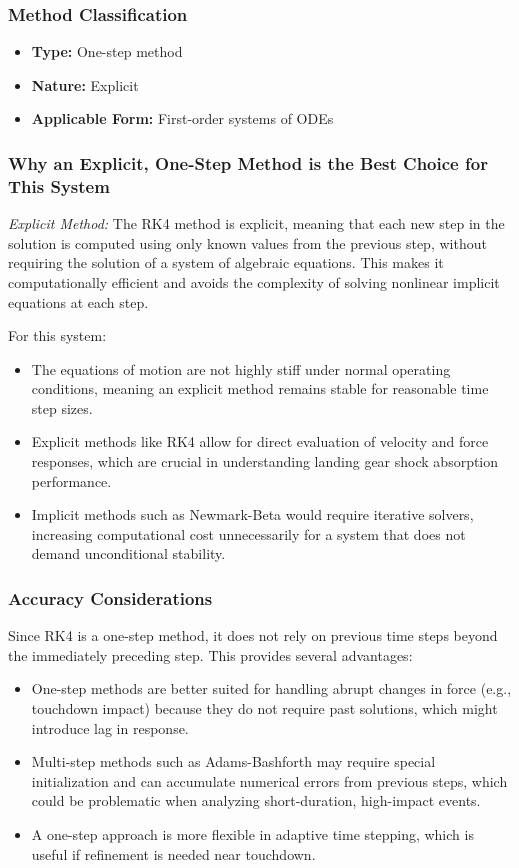 \documentclass[12pt,letterpaper, onecolumn]{exam}
\begin{document}
\begin{questions}
\begin{solution}
\begin{parts}
\subsubsection*{Method Classification}
\begin{itemize}
    \item \textbf{Type:} One-step method
    \item \textbf{Nature:} Explicit
    \item \textbf{Applicable Form:} First-order systems of ODEs
\end{itemize}

\subsubsection*{Why an Explicit, One-Step Method is the Best Choice for This System}

\textit{Explicit Method:} The RK4 method is explicit, meaning that each new step in the solution is computed using only known values from the previous step, without requiring the solution of a system of algebraic equations. This makes it computationally efficient and avoids the complexity of solving nonlinear implicit equations at each step. 

For this system:
\begin{itemize}
    \item The equations of motion are not highly stiff under normal operating conditions, meaning an explicit method remains stable for reasonable time step sizes.
    \item Explicit methods like RK4 allow for direct evaluation of velocity and force responses, which are crucial in understanding landing gear shock absorption performance.
    \item Implicit methods such as Newmark-Beta would require iterative solvers, increasing computational cost unnecessarily for a system that does not demand unconditional stability.
\end{itemize}

\subsubsection*{Accuracy Considerations}

Since RK4 is a one-step method, it does not rely on previous time steps beyond the immediately preceding step. This provides several advantages:
\begin{itemize}
    \item One-step methods are better suited for handling abrupt changes in force (e.g., touchdown impact) because they do not require past solutions, which might introduce lag in response.
    \item Multi-step methods such as Adams-Bashforth may require special initialization and can accumulate numerical errors from previous steps, which could be problematic when analyzing short-duration, high-impact events.
    \item A one-step approach is more flexible in adaptive time stepping, which is useful if refinement is needed near touchdown.
\end{itemize}


\end{parts}
\end{solution}
\end{questions}
\end{document}
